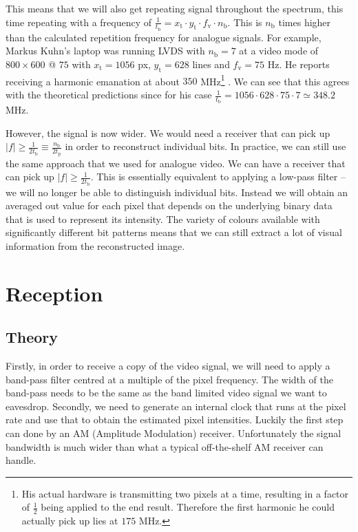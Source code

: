 \documentclass[a4paper,12pt,twoside,openright]{report}
\begin{document}
This means that we will also get repeating signal throughout the spectrum, this time repeating with a frequency of $\frac{1}{t_\text{b}} = x_\text{t} \cdot y_\text{t} \cdot f_\text{v} \cdot n_\text{b}$. This is $n_\text{b}$ times higher than the calculated repetition frequency for analogue signals. For example, Markus Kuhn's laptop was running LVDS with $n_\text{b}=7$ at a video mode of $800 \times 600 $ @ $ 75$ with $x_\text{t} = 1056$ px, $y_\text{t} = 628$ lines and $f_\text{v} = 75$ Hz. He reports receiving a harmonic emanation at about $350$ MHz\footnote{His actual hardware is transmitting two pixels at a time, resulting in a factor of $\frac{1}{2}$ being applied to the end result. Therefore the first harmonic he could actually pick up lies at $175$ MHz.} \cite{kuhn2005electromagnetic}. We can see that this agrees with the theoretical predictions since for his case $\frac{1}{t_\text{b}} = 1056 \cdot 628 \cdot 75 \cdot 7 \simeq 348.2$ MHz.

However, the signal is now wider. We would need a receiver that can pick up $|f| \geq \frac{1}{2 t_\text{b}} \equiv \frac{n_\text{b}}{2 t_\text{p}}$ in order to reconstruct individual bits. In practice, we can still use the same approach that we used for analogue video. We can have a receiver that can pick up $|f| \geq \frac{1}{2 t_\text{b}}$. This is essentially equivalent to applying a low-pass filter -- we will no longer be able to distinguish individual bits. Instead we will obtain an averaged out value for each pixel that depends on the underlying binary data that is used to represent its intensity. The variety of colours available with significantly different bit patterns means that we can still extract a lot of visual information from the reconstructed image.

\section{Reception}

\subsection{Theory}
Firstly, in order to receive a copy of the video signal, we will need to apply a band-pass filter centred at a multiple of the pixel frequency. The width of the band-pass needs to be the same as the band limited video signal we want to eavesdrop. Secondly, we need to generate an internal clock that runs at the pixel rate and use that to obtain the estimated pixel intensities. Luckily the first step can done by an AM (Amplitude Modulation) receiver. Unfortunately the signal bandwidth is much wider than what a typical off-the-shelf AM receiver can handle.
\end{document}
